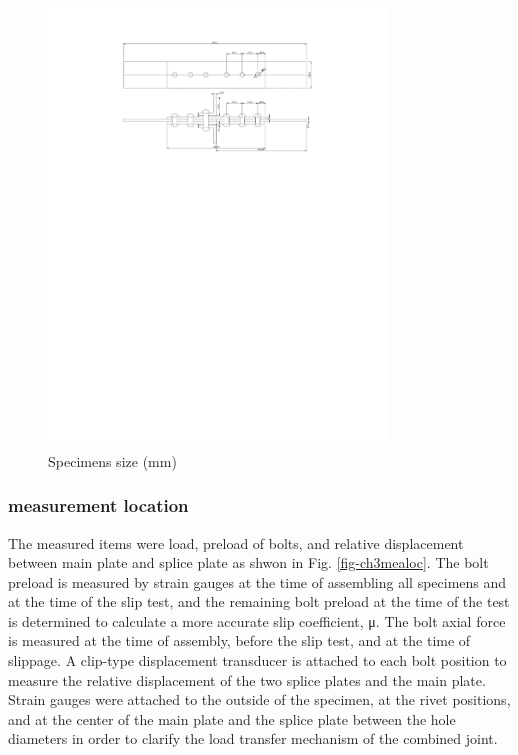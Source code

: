 \begin{figure}[htbp]
    \centering
    \includegraphics[width=0.8\textwidth]{imgs/ch3/sepc-size.pdf}
    \caption{Specimens size (mm) }
    \label{fig-sepc-size}
\end{figure}

\subsubsection{measurement location}

The measured items were load, preload of bolts, and relative displacement between main plate and splice plate as shwon in Fig. \ref{fig-ch3mealoc}. The bolt preload is measured by strain gauges at the time of assembling all specimens and at the time of the slip test, and the remaining bolt preload at the time of the test is determined to calculate a more accurate slip coefficient, μ. The bolt axial force is measured at the time of assembly, before the slip test, and at the time of slippage. A clip-type displacement transducer is attached to each bolt position to measure the relative displacement of the two splice plates and the main plate. Strain gauges were attached to the outside of the specimen, at the rivet positions, and at the center of the main plate and the splice plate between the hole diameters in order to clarify the load transfer mechanism of the combined joint.

